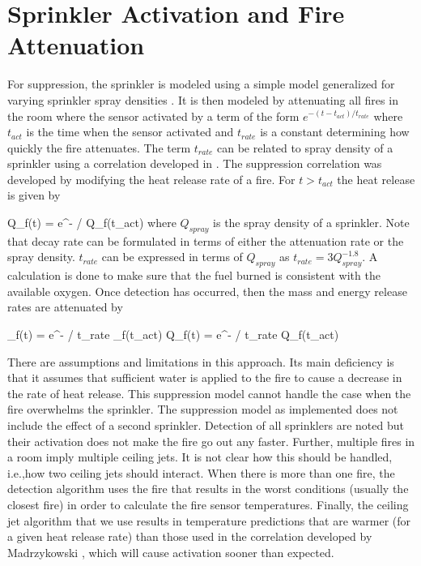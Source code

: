 \section{Sprinkler Activation and Fire Attenuation} \label{sec:suppression}

For suppression, the sprinkler is modeled using a simple model \cite{Madrzykowski:1992} generalized for varying sprinkler spray densities \cite{Evans:1993}. It is then modeled by attenuating all fires in the room where the sensor activated by a term of the form $e^{-(t-t_{act})/t_{rate}}$ where $t_{act}$ is the time when the sensor activated and $t_{rate}$ is a constant determining how quickly the fire attenuates. The term $t_{rate}$ can be related to spray density of a sprinkler using a correlation developed in \cite{Evans:1993}. The suppression correlation was developed by modifying the heat release rate of a fire. For $t > t_{act}$ the heat release is given by

\be Q_f(t) = e^{- / } Q_f(t_{act}) \ee
where $Q_{spray}$ is the spray density of a sprinkler. Note that decay rate can be formulated in terms of either the attenuation rate or the spray density. $t_{rate}$ can be expressed in terms of $Q_{spray}$ as $t_{rate} = 3Q_{spray}^{-1.8}$. A calculation is done to make sure that the fuel burned is consistent with the available oxygen. Once detection has occurred, then the mass and energy release rates are attenuated by

\be {}_f(t) = e^{- / t_{rate}} _f(t_{act}) \ee
\be Q_f(t) = e^{- / t_{rate}} Q_f(t_{act}) \ee

There are assumptions and limitations in this approach. Its main deficiency is that it assumes that sufficient water is applied to the fire to cause a decrease in the rate of heat release. This suppression model cannot handle the case when the fire overwhelms the sprinkler.  The suppression model as implemented does not include the effect of a second sprinkler. Detection of all sprinklers are noted but their activation does not make the fire go out any faster. Further, multiple fires in a room imply multiple ceiling jets. It is not clear how this should be handled, i.e.,how two ceiling jets should interact. When there is more than one fire, the detection algorithm uses the fire that results in the worst conditions (usually the closest fire) in order to calculate the fire sensor temperatures.  Finally, the ceiling jet algorithm that we use results in temperature predictions that are warmer (for a given heat release rate) than those used in the correlation developed by Madrzykowski \cite{Madrzykowski:1995}, which will cause activation sooner than expected.

